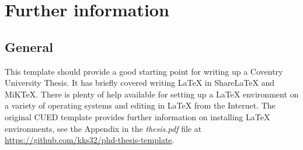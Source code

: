 \chapter{Further information}

\section*{General}

This template should provide a good starting point for writing up a Coventry University Thesis. It has briefly covered writing \LaTeX{} in ShareLaTeX and MiKTeX. There is plenty of help available for setting up a \LaTeX{} environment on a variety of operating systems and editing in \LaTeX{} from the Internet. The original CUED template provides further information on installing \LaTeX{} environments, see the Appendix in the \textit{thesis.pdf} file at \url{https://github.com/kks32/phd-thesis-template}.

